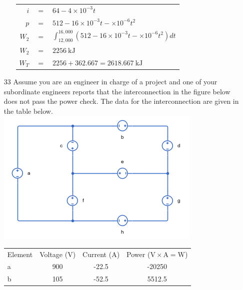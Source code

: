 \documentclass[a4paper]{article}
\begin{document}
\begin{itemize}
\begin{itemize}
\begin{tabular}{r c l}
	      	      	$i$                                         & $=$ & $64 - 4\times10^{-3}t$                                                      \\
	      	      	$p$                                         & $=$ & $512 - 16\times10^{-3}t - \times10^{-6}t^{2}$                               \\
	      	      	$W_{2}$                                     & $=$ & $\int_{12,000}^{16,000} (512 - 16\times10^{-3}t - \times10^{-6}t^{2})dt$    \\
	      	      	$W_{2}$                                     & $=$ & $\SI{2256}{\kilo\joule}$                                                    \\
	      	      	$W_{T}$                                     & $=$ & $2256 + 362.667 = \SI{2618.667}{\kilo\joule}$                               \\
	      	      \end{tabular} 
	      \end{itemize}
	\item[33] Assume you are an engineer in charge of a project and one of your subordinate engineers reports that the interconnection in the figure below does not pass the power check. The data for the interconnection are given in the table below. \\
	      \includegraphics{P1-33.png} \\
	      \begin{tabular}{l c c c}
	      	Element & Voltage (\si{\volt}) & Current (\si{\ampere}) & Power ($\si{\volt}\times\si{\ampere} = \si{\watt}$) \\
	      	a       & 900                  & -22.5                  & -20250                                              \\
	      	b       & 105                  & -52.5                  & 5512.5                                              \\

\end{tabular}
\end{itemize}
\end{document}
